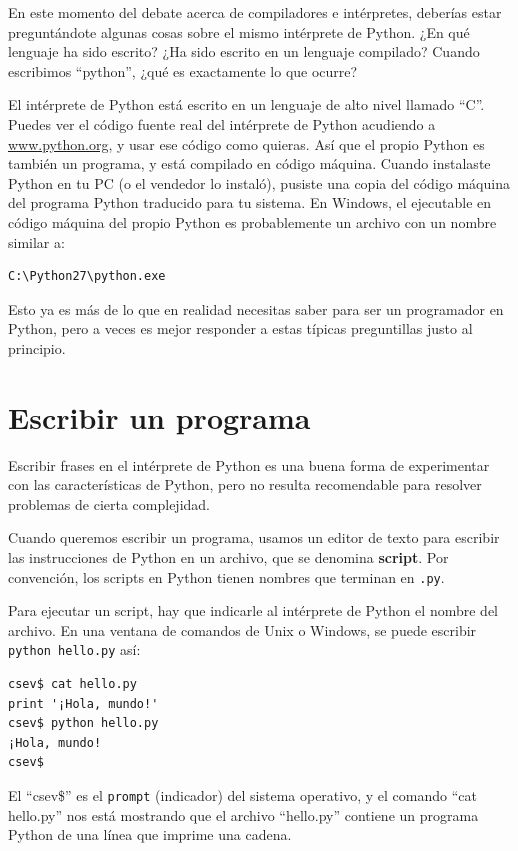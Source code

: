 En este momento del debate acerca de compiladores e intérpretes, deberías
estar preguntándote algunas cosas sobre el mismo intérprete de Python. ¿En qué
lenguaje ha sido escrito? ¿Ha sido escrito en un lenguaje compilado? Cuando escribimos ``python'', ¿qué es exactamente lo que ocurre?

El intérprete de Python está escrito en un lenguaje de alto nivel llamado ``C''.
Puedes ver el código fuente real del intérprete de Python acudiendo a
\url{www.python.org}, y usar ese código como quieras.
Así que el propio Python es también un programa, y está compilado en código máquina.
Cuando instalaste Python en tu PC (o el vendedor lo instaló),
pusiste una copia del código máquina del programa Python traducido para tu sistema.
En Windows, el ejecutable en código máquina del propio Python es probablemente
un archivo con un nombre similar a:

\beforeverb
\begin{verbatim}
C:\Python27\python.exe
\end{verbatim}
\afterverb
%
Esto ya es más de lo que en realidad necesitas saber para ser un programador en Python,
pero a veces es mejor responder a estas típicas preguntillas justo
al principio.

\section{Escribir un programa}

Escribir frases en el intérprete de Python es una buena forma de experimentar
con las características de Python, pero no resulta recomendable para resolver problemas
de cierta complejidad.

Cuando queremos escribir un programa,
usamos un editor de texto para escribir las instrucciones de Python en un archivo,
que se denomina {\bf script}. Por
convención, los scripts en Python tienen nombres que terminan en {\tt .py}.


Para ejecutar un script, hay que indicarle al intérprete de Python
el nombre del archivo. En una ventana de comandos de Unix o Windows,
se puede escribir {\tt python hello.py} así:

\beforeverb
\begin{verbatim}
csev$ cat hello.py
print '¡Hola, mundo!'
csev$ python hello.py
¡Hola, mundo!
csev$
\end{verbatim}
\afterverb
%
El ``csev\$'' es el {\tt prompt} (indicador) del sistema operativo, y el comando ``cat hello.py'' nos
está mostrando que el archivo ``hello.py'' contiene un programa Python de una línea
que imprime una cadena.

